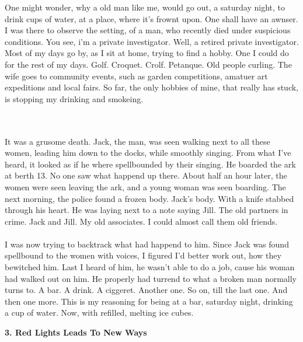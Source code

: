 \documentclass[]{article}
\begin{document}
	One might wonder, why a old man like me, would go out, a saturday night, to drink cups of water, at a place, where it's frownt upon. One shall have an awnser. I was there to observe the setting, of a man, who recently died under suspicious conditions. You see, i'm a private investigator. Well, a retired private investigator. Most of my days go by, as I sit at home, trying to find a hobby. One I could do for the rest of my days. Golf. Croquet. Crolf. Petanque. Old people curling. The wife goes to community events, such as garden competitions, amatuer art expeditions and local fairs. So far, the only hobbies of mine, that really has stuck, is stopping my drinking and smokeing. 

	\\ \\
	It was a grusome death. Jack, the man, was seen walking next to all these women, leading him down to the docks, while smoothly singing. From what I've heard, it looked as if he where spellbounded by their singing. He boarded the ark at berth 13. No one saw what happend up there. About half an hour later, the women were seen leaving the ark, and a young woman was seen boarding. The next morning, the police found a frozen body. Jack's body. With a knife stabbed through his heart. He was laying next to a note saying Jill. The old partners in crime. Jack and Jill. My old associates. I could almost call them old friends.
	\\ \\
	I was now trying to backtrack what had happend to him. Since Jack was found spellbound to the women with voices, I figured I'd better work out, how they bewitched him. Last I heard of him, he wasn't able to do a job, cause his woman had walked out on him. He properly had turrend to what a broken man normally turns to. A bar. A drink. A ciggeret. Another one. So on, till the last one. And then one more. This is my reasoning for being at a bar, saturday night, drinking a cup of water. Now, with refilled, melting ice cubes.

	\begin{center}
		\large\textbf{3. Red Lights Leads To New Ways}
	\end{center}
\end{document}
